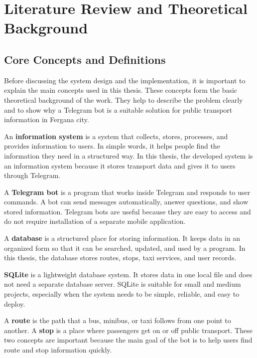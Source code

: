\chapter{Literature Review and Theoretical Background}
\label{chap:litreview}
\label{ch:literature}

\section{Core Concepts and Definitions}
\label{sec:concepts}

Before discussing the system design and the implementation, it is important to explain the main concepts used in this thesis. These concepts form the basic theoretical background of the work. They help to describe the problem clearly and to show why a Telegram bot is a suitable solution for public transport information in Fergana city.

An \textbf{information system} is a system that collects, stores, processes, and provides information to users. In simple words, it helps people find the information they need in a structured way. In this thesis, the developed system is an information system because it stores transport data and gives it to users through Telegram.

A \textbf{Telegram bot} is a program that works inside Telegram and responds to user commands. A bot can send messages automatically, answer questions, and show stored information. Telegram bots are useful because they are easy to access and do not require installation of a separate mobile application.\cite{telegram_botapi}

A \textbf{database} is a structured place for storing information. It keeps data in an organized form so that it can be searched, updated, and used by a program. In this thesis, the database stores routes, stops, taxi services, and user records. \cite{elmasri2016database}

\textbf{SQLite} is a lightweight database system. It stores data in one local file and does not need a separate database server. SQLite is suitable for small and medium projects, especially when the system needs to be simple, reliable, and easy to deploy.\cite{sqlite_docs, kreibich2010sqlite}

A \textbf{route} is the path that a bus, minibus, or taxi follows from one point to another. A \textbf{stop} is a place where passengers get on or off public transport. These two concepts are important because the main goal of the bot is to help users find route and stop information quickly.


